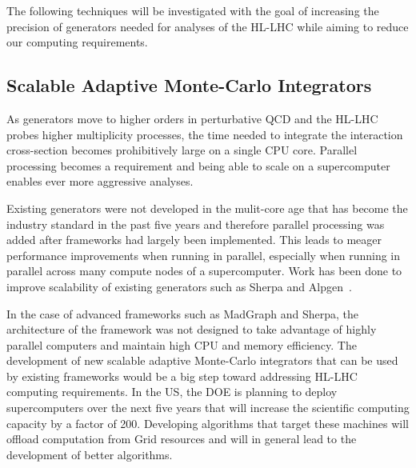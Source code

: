 \documentclass{article}
\begin{document}
The following techniques will be investigated with the goal of increasing the precision of generators needed for analyses of the HL-LHC while aiming to reduce our computing requirements.


\subsection{Scalable Adaptive Monte-Carlo Integrators}

As generators move to higher orders in perturbative QCD and the HL-LHC probes higher multiplicity processes, the time needed to integrate the interaction cross-section becomes prohibitively large on a single CPU core. Parallel processing becomes a requirement and being able to scale on a supercomputer enables ever more aggressive analyses. 

Existing generators were not developed in the mulit-core age that has become the industry standard in the past five years and therefore parallel processing was added after frameworks had largely been implemented. This leads to meager performance improvements when running in parallel, especially when running in parallel across many compute nodes of a supercomputer. Work has been done to improve scalability of existing generators such as Sherpa and Alpgen~\cite{AlpgenScaling2017}. 

In the case of advanced frameworks such as MadGraph and Sherpa, the architecture of the framework was not designed to take advantage of highly parallel computers and maintain high CPU and memory efficiency. The development of new scalable adaptive Monte-Carlo integrators that can be used by existing frameworks would be a big step toward addressing HL-LHC computing requirements. In the US, the DOE is planning to deploy supercomputers over the next five years that will increase the scientific computing capacity by a factor of 200. Developing algorithms that target these machines will offload computation from Grid resources and will in general lead to the development of better algorithms.

\end{document}
